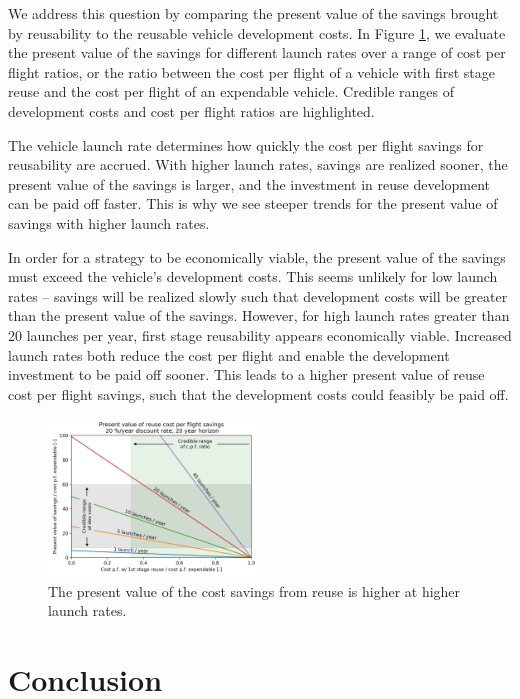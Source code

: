 \documentclass[conf]{new-aiaa}
\begin{document}
\begin{multicols}{2}
We address this question by comparing the present value of the savings brought by reusability to the reusable vehicle development costs. In Figure \ref{fig:reuse_npv}, we evaluate the present value of the savings for different launch rates over a range of cost per flight ratios, or the ratio between the cost per flight of a vehicle with first stage reuse and the cost per flight of an expendable vehicle. Credible ranges of development costs and cost per flight ratios are highlighted.

The vehicle launch rate determines how quickly the cost per flight savings for reusability are accrued. With higher launch rates, savings are realized sooner, the present value of the savings is larger, and the investment in reuse development can be paid off faster. This is why we see steeper trends for the present value of savings with higher launch rates. 

In order for a strategy to be economically viable, the present value of the savings must exceed the vehicle's development costs. This seems unlikely for low launch rates -- savings will be realized slowly such that development costs will be greater than the present value of the savings. However, for high launch rates greater than 20 launches per year, first stage reusability appears economically viable. Increased launch rates both reduce the cost per flight and enable the development investment to be paid off sooner. This leads to a higher present value of reuse cost per flight savings, such that the development costs could feasibly be paid off.

\begin{figure}[H]
    \centering
    \includegraphics[width=0.5\textwidth]{reuse_npv}
    \caption{\label{fig:reuse_npv} The present value of the cost savings from reuse is higher at higher launch rates.}
\end{figure}

\section{Conclusion}


\end{multicols}
\end{document}
